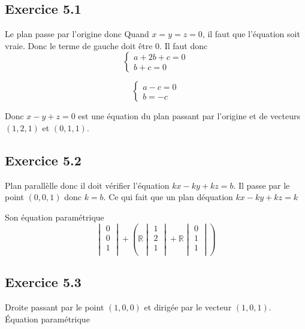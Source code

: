 \documentclass[]{book}
\theoremstyle{definition}
\newcommand{\bb}[1]{\mathbb{#1}}
\newcommand{\R}{\bb{R}}
\begin{document}
\subsection*{Exercice 5.1}
Le plan passe par l'origine donc Quand $x=y=z=0$, il faut que l'\'equation soit vraie. Donc le terme de gauche doit \^etre 0. Il faut donc
$$
\left\{ 
    \begin{array}{l}
        a + 2b + c = 0\\
        b + c = 0
    \end{array}
\right.
$$

$$
\left\{ 
    \begin{array}{l}
        a - c = 0\\
        b = - c
    \end{array}
\right.
$$

Donc $x - y + z = 0$ est une \'equation du plan passant par l'origine et de vecteurs $(1,2,1)$ et $(0,1,1)$.

\subsection*{Exercice 5.2}
Plan parall\`elle donc il doit v\'erifier l'\'equation $kx -ky + kz = b$. Il passe par le point $(0,0,1)$ donc
$k = b$. Ce qui fait que un plan d\'equation $kx - ky + kz = k$

Son \'equation param\'etrique
$$
\begin{vmatrix}
    0 \\
    0 \\
    1 \\
\end{vmatrix}
+(\R
    \begin{vmatrix}
        1 \\
        2 \\
        1 \\
    \end{vmatrix}
+    
\R
    \begin{vmatrix}
        0 \\
        1 \\
        1 \\
    \end{vmatrix}
)
$$

\subsection*{Exercice 5.3}
Droite passant par le point $(1,0,0)$ et dirig\'ee par le vecteur $(1,0,1)$. 
\'Equation param\'etrique 
\end{document}
